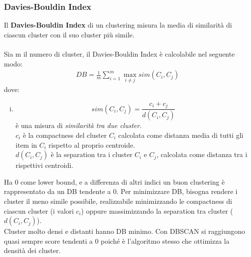 \subsubsection{Davies-Bouldin Index}
Il \textbf{Davies-Bouldin Index} di un clustering misura la media di similarità di ciascun cluster con il suo cluster più simile.\\
\\
Sia m il numero di cluster, il Davies-Bouldin Index è calcolabile nel seguente modo:
\begin{align}
DB = \frac{1}{m}\sum_{i=1}^{m}\max_{i \ne j}sim(C_i, C_j)
\end{align}
dove:
\begin{enumerate}[(i)]
	\item $$ sim(C_i, C_j) =  \frac{c_i + c_j}{d(C_i, C_j)}$$ è una misura di \textit{similarità tra due cluster}.\\
	$c_i$ è la compactness del cluster $C_i$ calcolata come distanza media di tutti gli item in $C_i$ rispetto al proprio centroide.\\
	$d(C_i, C_j)$ è la separation tra i cluster $C_i$ e $C_j$, calcolata come distanza tra i rispettivi centroidi.
\end{enumerate}
Ha 0 come lower bound, e a differenza di altri indici un buon clustering è rappresentato da un DB tendente a 0. Per minimizzare DB, bisogna rendere i cluster il meno simile possibile, realizzabile minimizzando le compactness di ciascun cluster (i valori $c_i$) oppure massimizzando la separation tra cluster ($d(C_i, C_j)$).\\
Cluster molto densi e distanti hanno DB minimo. Con DBSCAN si raggiungono quasi sempre score tendenti a 0 poiché è l'algoritmo stesso che ottimizza la densità dei cluster.

